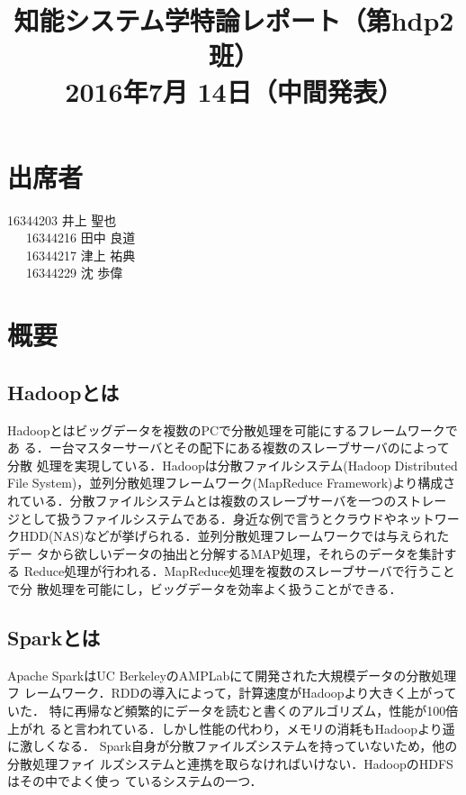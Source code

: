 \documentclass[a4paper,12pt]{jarticle}
\begin{document}
%
\title{\vspace{-30mm}知能システム学特論レポート（第hdp2班）\\ 2016年7月
14日（中間発表）}
\date{}
%
%
\maketitle
%
\vspace{-30mm}
%
\section{出席者}
16344203 井上 聖也\\
~~~16344216 田中 良道\\
~~~16344217 津上 祐典\\
~~~16344229 沈 歩偉
\section{概要}

\subsection{Hadoopとは}
Hadoopとはビッグデータを複数のPCで分散処理を可能にするフレームワークであ
る．ー台マスターサーバとその配下にある複数のスレーブサーバのによって分散
処理を実現している．Hadoopは分散ファイルシステム(Hadoop Distributed File
System)，並列分散処理フレームワーク(MapReduce
Framework)より構成されている．分散ファイルシステムとは複数のスレーブサーバを一つのストレー
ジとして扱うファイルシステムである．身近な例で言うとクラウドやネットワー
クHDD(NAS)などが挙げられる．並列分散処理フレームワークでは与えられたデー
タから欲しいデータの抽出と分解するMAP処理，それらのデータを集計する
Reduce処理が行われる．MapReduce処理を複数のスレーブサーバで行うことで分
散処理を可能にし，ビッグデータを効率よく扱うことができる．


\subsection{Sparkとは}
Apache SparkはUC BerkeleyのAMPLabにて開発された大規模データの分散処理フ
レームワーク．RDDの導入によって，計算速度がHadoopより大きく上がっていた．
特に再帰など頻繁的にデータを読むと書くのアルゴリズム，性能が100倍上がれ
ると言われている．しかし性能の代わり，メモリの消耗もHadoopより遥に激しくなる．
Spark自身が分散ファイルズシステムを持っていないため，他の分散処理ファイ
ルズシステムと連携を取らなければいけない．HadoopのHDFSはその中でよく使っ
ているシステムの一つ．
\end{document}
